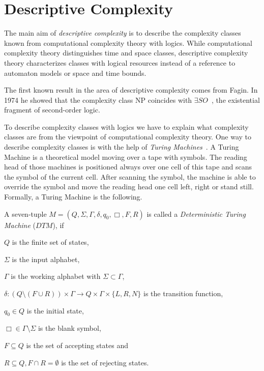 

\section{Descriptive Complexity}\label{sec:descriptiveComplexity}

The main aim of \emph{descriptive complexity} is to describe the complexity classes known from
computational complexity theory with logics. While computational complexity theory distinguishes time and space
classes, descriptive complexity theory characterizes classes with logical resources instead of a reference to
automaton models or space and time bounds.

The first known result in the area of descriptive complexity comes from Fagin. In 1974 he showed that the complexity
class NP coincides with $\exists SO$~\cite{fagin1974generalized}, the existential fragment of second-order logic.

To describe complexity classes with logics we have to explain what complexity classes are from the viewpoint of
computational complexity theory. One way to describe complexity classes is with the help of \textit{Turing
Machines}~\cite{hopcroft1994einfuehrung}.
A Turing Machine is a theoretical model moving over a tape with symbols. The reading head of
those machines is positioned always over one cell of this tape and scans the symbol of the current cell. After scanning
the symbol, the machine is able to override the symbol and move the reading head one cell left, right or stand still.
Formally, a Turing Machine is the following.

\begin{definition}
    A seven-tuple $M = (Q, \Sigma, \Gamma, \delta, q_0, \Box, F, R)$ is called a \emph{Deterministic Turing Machine}
    ($\mathit{DTM}$), if
    \begin{compactitem}
        \item $Q$ is the finite set of states,
        \item $\Sigma$ is the input alphabet,
        \item $\Gamma$ is the working alphabet with $\Sigma \subset \Gamma$,
        \item $\delta : (Q \setminus (F \cup R)) \times \Gamma \rightarrow Q \times \Gamma \times \{L, R, N\}$ is the
        transition function,
        \item $q_0 \in Q$ is the initial state,
        \item $\Box \in \Gamma \setminus \Sigma$ is the blank symbol,
        \item $F \subseteq Q$ is the set of accepting states and
        \item $R \subseteq Q, F \cap R = \emptyset$ is the set of rejecting states.
    \end{compactitem}
\end{definition}

